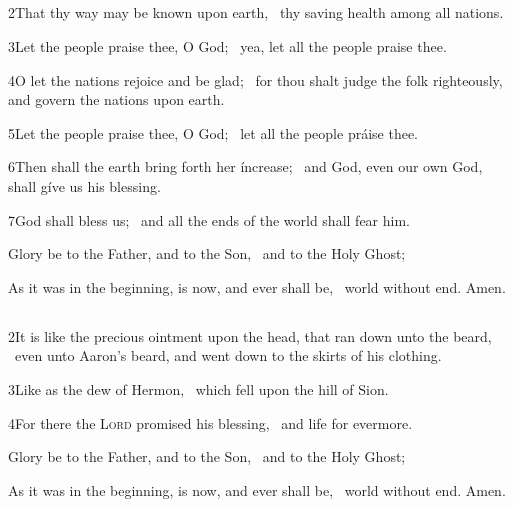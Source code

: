 \medskip
\centerline{}
\subsection[{Psalm 67}]{}

2\enspace That thy way may be known upon earth, \star\ thy saving health among all nations.

3\enspace Let the people praise thee, O God; \star\ yea, let all the people praise thee.

4\enspace O let the nations rejoice and be glad; \star\ for thou shalt judge the folk righteously, and govern the nations upon earth.

5\enspace Let the people praise thee, O God; \star\ let all the people práise thee.

6\enspace Then shall the earth bring forth her íncrease; \star\ and God, even our own God, shall gíve us his blessing.

7\enspace God shall bless us; \star\ and all the ends of the world shall fear him.

Glory be to the Father, and to the Son, \star\  and to the Holy Ghost;

As it was in the beginning, is now, and ever shall be, \star\  world without end. Amen.


\medskip
\centerline{}
\subsection[{Psalm 133}]{}

2\enspace It is like the precious ointment upon the head, that ran down unto the beard, \star\ even unto Aaron’s beard, and went down to the skirts of his clothing.

3\enspace Like as the dew of Hermon, \star\ which fell upon the hill of Sion.

4\enspace For there the {\scshape Lord} promised his blessing, \star\ and life for evermore.

Glory be to the Father, and to the Son, \star\  and to the Holy Ghost;

As it was in the beginning, is now, and ever shall be, \star\  world without end. Amen.

